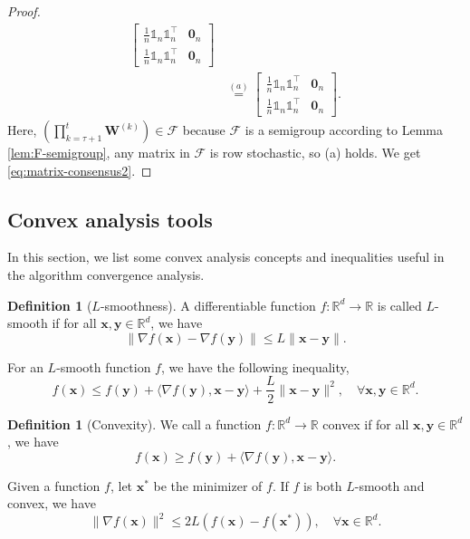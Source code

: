 \documentclass{article}
\newcommand{\vx}{\mathbf{x}}
\newcommand{\bvx}{\boldsymbol{x}}
\newcommand{\bvy}{\boldsymbol{y}}
\newcommand{\vzero}{\mathbf{0}}
\newcommand{\vW}{\mathbf{W}}
\newcommand{\ko}{{(k)}}
\newcommand{\bbR}{\mathbb{R}}
\newcommand{\bbone}{\mathds{1}}
\theoremstyle{plain}
\theoremstyle{definition}
\newtheorem{definition}[theorem]{Definition}
\begin{document}
\begin{proof}
\begin{align*}
\left[
\begin{array}{cc}
    \frac{1}{n}\bbone_n\bbone_n^\top & \vzero_n \\
    \frac{1}{n}\bbone_n\bbone_n^\top & \vzero_n
\end{array}\right]\\
&\stackrel{(a)}=\left[
\begin{array}{cc}
    \frac{1}{n}\bbone_n\bbone_n^\top & \vzero_n \\
    \frac{1}{n}\bbone_n\bbone_n^\top & \vzero_n
\end{array}\right].
\end{align*}
Here, $\left(\prod_{k=\tau+1}^{t}\vW^\ko\right)\in\mathscr{F}$ because $\mathscr{F}$ is a semigroup according to Lemma \ref{lem:F-semigroup}, any matrix in $\mathscr{F}$ is row stochastic, so (a) holds. We get \eqref{eq:matrix-consensus2}.
\end{proof}
\subsection{Convex analysis tools}
{In this section, we list some convex analysis concepts and inequalities useful in the algorithm convergence analysis.
\begin{definition}[$L$-smoothness]
A differentiable function $f:\bbR^d\rightarrow\bbR$ is called $L$-smooth if for all $\bvx,\bvy\in\bbR^d$, we have
\begin{equation}
\label{eq:L-smooth-eq-def1}
\|\nabla f(\bvx)-\nabla f(\bvy)\|\leq L\|\bvx-\bvy\|.
\end{equation}
\end{definition}
For an $L$-smooth function $f$, we have the following inequality,
\begin{equation}
\label{eq:L-smooth-eq-def2}
f(\bvx)\leq f(\bvy)+\langle \nabla f(\bvy),\bvx-\bvy \rangle+\frac{L}{2}\|\bvx-\bvy\|^2,\quad \forall \bvx,\bvy\in\bbR^d.
\end{equation}}

{
\begin{definition}[Convexity]
We call a function $f:\bbR^d\rightarrow\bbR$ convex if for all $\bvx,\bvy\in\bbR^d$, we have
\begin{equation}
\label{eq:conv-def}
f(\bvx)\geq f(\bvy)+\langle \nabla f(\bvy),\bvx-\bvy \rangle.
\end{equation}
\end{definition}}


{Given a function $f$, let} $\vx^*$ be the minimizer of $f$. If $f$ is both $L$-smooth and convex, we have
\begin{equation}
\label{eq:conv-Lip-ineq}
\|\nabla f(\vx)\|^2\leq 2L(f(\vx)-f(\vx^*)),\quad \forall \vx\in\bbR^d.
\end{equation}
\end{document}
